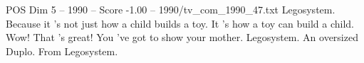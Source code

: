 \begin{textsample}{POS Dim 5 – 1990 – Score -1.00 – 1990/tv\_com\_1990\_47.txt}  \label{ex:f5_pos_030}
Legosystem.
Because it 's not just how a child builds a toy.
It 's how a toy can build a child.
Wow!
That 's great!
You 've got to show your mother.
Legosystem.
An oversized Duplo.
From Legosystem.

\end{textsample}
